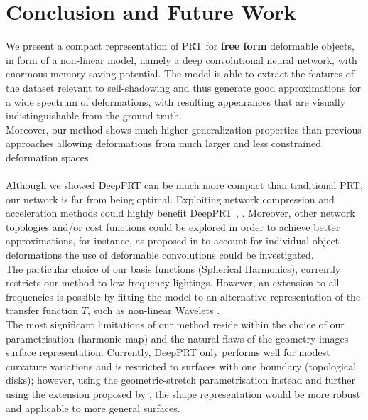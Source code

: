 \section{Conclusion and Future Work}
We present a compact representation of PRT for \textbf{free form} deformable objects, in form of a non-linear model, namely a deep convolutional neural network, with enormous memory saving potential.
 The model is able to extract the features of the dataset relevant to self-shadowing and thus generate good approximations for a wide spectrum of deformations, with resulting appearances that are visually indistinguishable from the ground truth.  
\\
Moreover, our method shows much higher generalization properties than previous approaches allowing deformations from much larger and less constrained deformation spaces.
\\
\\
Although we showed DeepPRT can be much more compact than traditional PRT, our network is far from being optimal. Exploiting network compression and acceleration methods could highly benefit DeepPRT \cite{Survey_NN_Compression}, \cite{Deep_Compression}.
Moreover, other network topologies and/or cost functions could be explored in order to achieve  better approximations, for instance, as proposed in \cite{Deformable_UNet} to account for individual object deformations the use of deformable convolutions \cite{DeformableCNN} could be investigated.
\\
The particular choice of our basis functions (Spherical Harmonics), currently restricts our method to low-frequency lightings. However, an extension to all-frequencies is possible by fitting the model to an alternative representation of the transfer function $T$, such as non-linear Wavelets \cite{AllFrequencyPRT}.
\\
The most significant limitations of our method reside within the choice of our parametrisation (harmonic map) and the natural flaws of the geometry images surface representation.  Currently, DeepPRT only performs well for modest curvature variations and is restricted to surfaces with one boundary (topological disks); however, using the geometric-stretch parametrisation instead and further using the extension proposed by \cite{Spherical_Parametrization}, the shape representation would be more robust and applicable to more general surfaces. 
